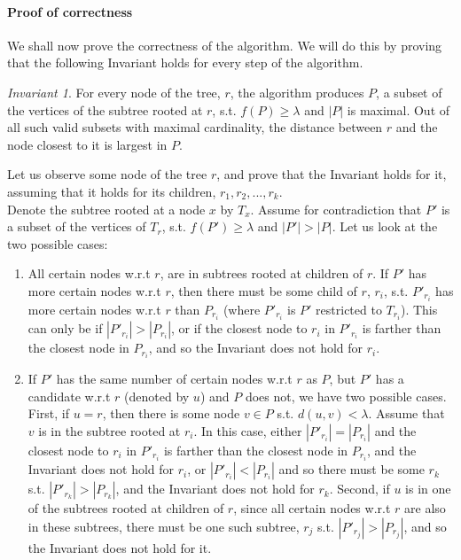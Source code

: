 \documentclass[11pt,a4paper]{article}
\theoremstyle{definition}
\theoremstyle{remark}
\newtheorem{invariant}{Invariant}
\begin{document}
\paragraph{Proof of correctness}
We shall now prove the correctness of the algorithm. We will do this by proving that the following Invariant holds for every step of the algorithm.
\begin{invariant}\label{Maximality of P and distance of closest node invariant}
For every node of the tree, $r$, the algorithm produces $P$, a subset of the vertices of the subtree rooted at $r$, s.t. $f(P)\geq\lambda$ and $|P|$ is maximal. Out of all such valid subsets with maximal cardinality, the distance between $r$ and the node closest to it is largest in $P$.
\end{invariant}

Let us observe some node of the tree $r$, and prove that the Invariant holds for it, assuming that it holds for its children, $r_{1},r_{2},...,r_{k}$.\\
Denote the subtree rooted at a node $x$ by $T_x$. Assume for contradiction that $P'$ is a subset of the vertices of $T_r$, s.t. $f(P')\geq\lambda$ and $|P'| > |P|$. Let us look at the two possible cases:
\begin{enumerate}
\item All certain nodes w.r.t $r$, are in subtrees rooted at children of $r$. If $P'$ has more certain nodes w.r.t $r$, then there must be some child of $r$, $r_i$, s.t. $P'_{r_i}$ has more certain nodes w.r.t $r$ than $P_{r_i}$ (where $P'_{r_i}$ is $P'$ restricted to $T_{r_i}$). This can only be if $|P'_{r_i}| > |P_{r_i}|$, or if the closest node to $r_i$ in $P'_{r_i}$ is farther than the closest node in $P_{r_i}$, and so the Invariant does not hold for $r_i$.
\item If  $P'$ has the same number of certain nodes w.r.t $r$ as $P$, but $P'$ has a candidate w.r.t $r$ (denoted by $u$) and $P$ does not, we have two possible cases. First, if $u=r$, then there is some node $v \in P$ s.t. $d(u,v)<\lambda$. Assume that $v$ is in the subtree rooted at $r_i$. In this case, either $|P'_{r_i}|=|P_{r_i}|$ and the closest node to $r_i$ in $P'_{r_i}$ is farther than the closest node in $P_{r_i}$, and the Invariant does not hold for $r_i$, or $|P'_{r_i}|<|P_{r_i}|$ and so there must be some $r_k$ s.t. $|P'_{r_k}|>|P_{r_k}|$, and the Invariant does not hold for $r_k$. Second, if $u$ is in one of the subtrees rooted at children of $r$, since all certain nodes w.r.t $r$ are also in these subtrees, there must be one such subtree, $r_j$ s.t. $|P'_{r_j}| > |P_{r_j}|$, and so the Invariant does not hold for it.
\end{enumerate} 
\end{document}
